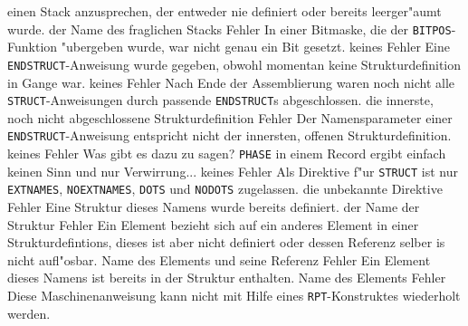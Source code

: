 \documentclass[12pt,a4paper,twoside]{report}
\newcommand{\tty}[1]{{\tt #1}}
\begin{document}
\begin{description}
{                einen Stack anzusprechen, der entweder nie definiert oder
                bereits leerger"aumt wurde.}
               {der Name des fraglichen Stacks}
	       {Fehler}
               {In einer Bitmaske, die der \tty{BITPOS}-
                Funktion "ubergeben wurde, war nicht genau ein Bit
                gesetzt.}
               {keines}
               {Fehler}
               {Eine \tty{ENDSTRUCT}-Anweisung wurde gegeben, obwohl
                momentan keine Strukturdefinition in Gange war.}
               {keines}
               {Fehler}
               {Nach Ende der Assemblierung waren noch nicht alle
                \tty{STRUCT}-Anweisungen durch passende \tty{ENDSTRUCT}s
                abgeschlossen.}
               {die innerste, noch nicht abgeschlossene
                Strukturdefinition}
               {Fehler}
               {Der Namensparameter einer \tty{ENDSTRUCT}-Anweisung
                entspricht nicht der innersten, offenen
                Strukturdefinition.}
               {keines}
               {Fehler}
               {Was gibt es dazu zu sagen?  \tty{PHASE} in einem Record
                ergibt einfach keinen Sinn und nur Verwirrung...}
               {keines}
\errentry{1554}{ung"ultige \tty{STRUCT}-Direktive}
               {Fehler}
               {Als Direktive f"ur \tty{STRUCT} ist nur
                \tty{EXTNAMES}, \tty{NOEXTNAMES}, \tty{DOTS} und
                \tty{NODOTS} zugelassen.}
               {die unbekannte Direktive}
               {Fehler}
               {Eine Struktur dieses Namens wurde bereits definiert.}
               {der Name der Struktur}
               {Fehler}
               {Ein Element bezieht sich auf ein anderes Element in
                einer Strukturdefintions, dieses ist aber nicht
                definiert oder dessen Referenz selber is nicht
                aufl"osbar.}
               {Name des Elements und seine Referenz}
               {Fehler}
               {Ein Element dieses Namens ist bereits in der Struktur
                enthalten.}
               {Name des Elements}
               {Fehler}
               {Diese Maschinenanweisung kann nicht mit Hilfe eines
                {\tt RPT}-Konstruktes wiederholt werden.}

\end{description}
\end{document}
